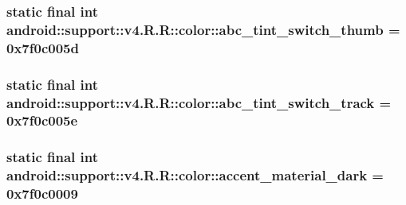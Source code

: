 \hypertarget{classandroid_1_1support_1_1v4_1_1_r_1_1color_5b1252782edd139177173be643b79fad}{
\subsubsection[{abc\_\-tint\_\-switch\_\-thumb}]{\setlength{\rightskip}{0pt plus 5cm}static final int android::support::v4.R.R::color::abc\_\-tint\_\-switch\_\-thumb = 0x7f0c005d}}
\label{classandroid_1_1support_1_1v4_1_1_r_1_1color_5b1252782edd139177173be643b79fad}


\hypertarget{classandroid_1_1support_1_1v4_1_1_r_1_1color_f9966ef7fcded5f6df8e42fc932b3cbb}{
\subsubsection[{abc\_\-tint\_\-switch\_\-track}]{\setlength{\rightskip}{0pt plus 5cm}static final int android::support::v4.R.R::color::abc\_\-tint\_\-switch\_\-track = 0x7f0c005e}}
\label{classandroid_1_1support_1_1v4_1_1_r_1_1color_f9966ef7fcded5f6df8e42fc932b3cbb}


\hypertarget{classandroid_1_1support_1_1v4_1_1_r_1_1color_599323cc895788c2aa81ed75757816c6}{
\subsubsection[{accent\_\-material\_\-dark}]{\setlength{\rightskip}{0pt plus 5cm}static final int android::support::v4.R.R::color::accent\_\-material\_\-dark = 0x7f0c0009}}
\label{classandroid_1_1support_1_1v4_1_1_r_1_1color_599323cc895788c2aa81ed75757816c6}



